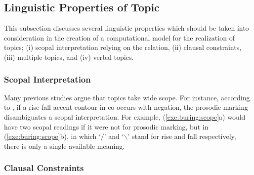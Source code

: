 \subsection{Linguistic Properties of Topic}
\label{3:ssec:properties-topic}



This subsection discusses several linguistic properties which should
be taken into consideration in the creation of a computational model
for the realization of topics; (i) scopal interpretation relying on
the  relation, (ii) clausal constraints, (iii) multiple
topics, and (iv) verbal topics.



\subsubsection{Scopal Interpretation}
\label{3:sssec:scopal-interpretation}

Many previous studies argue that topics take wide scope. For instance,
according to \citet{buring:97}, if a rise-fall accent contour in
 co-occurs with negation, the prosodic
marking disambiguates a scopal interpretation. For example,
(\ref{exe:buring:scope}a) would have two scopal readings if it were
not for prosodic marking, but in (\ref{exe:buring:scope}b), in which
`\ensuremath{\slash}' and `\ensuremath{\backslash}' stand for rise and
fall respectively, there is only a single available meaning.








\subsubsection{Clausal Constraints}
\label{3:sssec:clausal-constraints}



